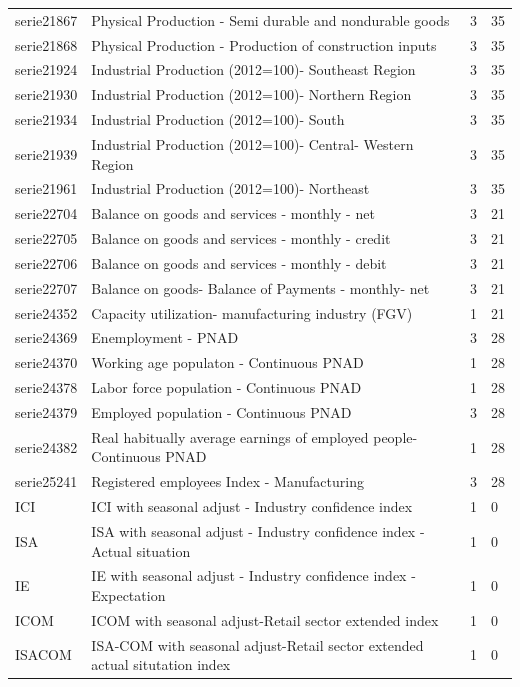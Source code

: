 \documentclass{article}
\begin{document}
{\begin{landscape}
\begin{center}
\begin{longtable}{|l|l|l|l|}
serie21867 & Physical Production - Semi durable and nondurable goods & 3 & 35 \\
serie21868 & Physical Production - Production of construction inputs & 3 & 35 \\
serie21924 & Industrial Production (2012=100)- Southeast Region & 3 & 35 \\
serie21930 & Industrial Production (2012=100)- Northern Region & 3 & 35 \\
serie21934 & Industrial Production (2012=100)- South & 3 & 35 \\
serie21939 & Industrial Production (2012=100)- Central- Western Region & 3 & 35 \\
serie21961 & Industrial Production (2012=100)- Northeast & 3 & 35 \\
serie22704 & Balance on goods and services - monthly - net & 3 & 21 \\
serie22705 & Balance on goods and services - monthly - credit & 3 & 21 \\
serie22706 & Balance on goods and services - monthly - debit & 3 & 21 \\
serie22707 & Balance on goods- Balance of Payments - monthly- net & 3 & 21 \\
serie24352 & Capacity utilization- manufacturing industry (FGV) & 1 & 21 \\
serie24369 & Enemployment - PNAD & 3 & 28 \\
serie24370 & Working age populaton - Continuous PNAD & 1 & 28 \\
serie24378 & Labor force population - Continuous PNAD & 1 & 28 \\
serie24379 & Employed population - Continuous PNAD & 3 & 28 \\
serie24382 & Real habitually average earnings of employed people- Continuous PNAD & 1 & 28 \\
serie25241 & Registered employees Index - Manufacturing & 3 & 28 \\
ICI & ICI with seasonal adjust - Industry confidence index & 1 & 0 \\
ISA & ISA with seasonal adjust - Industry confidence index - Actual situation & 1 & 0 \\
IE & IE with seasonal adjust - Industry confidence index - Expectation & 1 & 0 \\
ICOM & ICOM with seasonal adjust-Retail sector extended index & 1 & 0 \\
ISACOM & ISA-COM with seasonal adjust-Retail sector extended actual situtation index & 1 & 0 \\

\end{longtable}
\end{center}
\end{landscape}}
\end{document}
